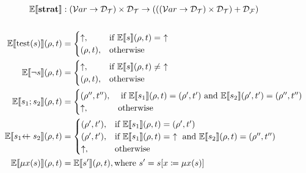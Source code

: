\documentclass{article}
\begin{document}
{%

\begin{align*}
  \mathbb{E} \llbracket \mathbf{strat} \rrbracket &: (\var \rightarrow \Domain_\Terms) \times \Domain_\Terms \rightarrow (((\var \rightarrow \Domain_\Terms) \times \Domain_\Terms) + \Domain_\Fail) \\
  \\
  \eval{\test{s}}{\rho}{t} &=
    \begin{cases}
      \fail,& \text{if } \eval{s}{\rho}{t} =\ \fail \\
      (\rho,t),& \text{otherwise}
    \end{cases} \\
  \eval{\neg s}{\rho}{t} &=
    \begin{cases}
      \fail,& \text{if } \eval{s}{\rho}{t} \neq\ \fail \\
      (\rho,t),& \text{otherwise}
    \end{cases} \\
  \eval{\seq{s_1}{s_2}}{\rho}{t} &=
    \begin{cases}
      (\rho'',t''), & \text{ if } \eval{s_1}{\rho}{t} = (\rho',t') \text{ and } \eval{s_2}{\rho'}{t'} = (\rho'',t'') \\
      \fail, & \text{otherwise}
    \end{cases} \\
  \eval{\leftchoice{s_1}{s_2}}{\rho}{t} &=
    \begin{cases}
      (\rho',t'), & \text{if } \eval{s_1}{\rho}{t} = (\rho',t') \\
      (\rho',t'), & \text{if } \eval{s_1}{\rho}{t} =\ \fail \text{ and } \eval{s_2}{\rho}{t} = (\rho'',t'') \\
      \fail, & \text{otherwise}
    \end{cases} \\
  \eval{\fix{x}{s}}{\rho}{t} &= \eval{s'}{\rho}{t}, \text{where } s' = s[x \coloneqq \fix{x}{s}] \\

\end{align*}}
\end{document}
